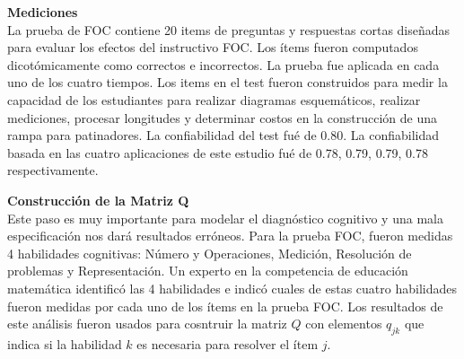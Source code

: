 \noindent
\textbf{Mediciones}\\
La prueba de FOC contiene 20 items de preguntas y respuestas cortas dise\~{n}adas para evaluar los efectos del instructivo FOC. Los \'{i}tems fueron computados dicot\'{o}micamente como correctos e incorrectos. La prueba fue aplicada en cada uno de los cuatro tiempos. Los items en el test fueron construidos para medir la capacidad de los estudiantes para realizar diagramas esquem\'{a}ticos, realizar mediciones, procesar longitudes y determinar costos en la construcci\'{o}n de una rampa para patinadores. La confiabilidad del test fu\'{e} de 0.80. La confiabilidad basada en las cuatro aplicaciones de este estudio fu\'{e} de 0.78, 0.79, 0.79, 0.78 respectivamente.

\noindent
\textbf{Construcci\'{o}n de la Matriz Q}\\
Este paso es muy importante para modelar el diagn\'{o}stico cognitivo y una mala especificaci\'{o}n nos dar\'{a} resultados err\'{o}neos. Para la prueba FOC, fueron medidas 4 habilidades cognitivas: N\'{u}mero y Operaciones, Medici\'{o}n, Resoluci\'{o}n de problemas y Representaci\'{o}n. Un experto en la competencia de educaci\'{o}n matem\'{a}tica identific\'{o} las 4 habilidades e indic\'{o} cuales de estas cuatro habilidades fueron medidas por cada uno de los \'{i}tems en la prueba FOC. Los resultados de este an\'{a}lisis fueron usados para cosntruir la matriz $Q$ con elementos $q_{j k}$ que indica si la habilidad $k$ es necesaria para resolver el \'{i}tem $j$.\\



